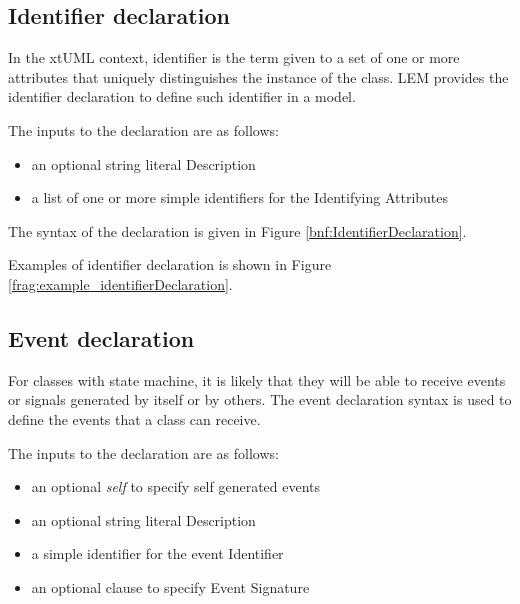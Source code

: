 

\subsection{Identifier declaration}\label{identifierDeclaration}
In the xtUML context, identifier is the term given to a set of one or more attributes that uniquely distinguishes the instance of the class. LEM provides the identifier declaration to define such identifier in a model.

The inputs to the declaration are as follows:
\begin{itemize}
\item an optional string literal Description
\item a list of one or more simple identifiers for  the Identifying Attributes
\end{itemize}

The syntax of the declaration is given in Figure \ref{bnf:IdentifierDeclaration}.


Examples of identifier declaration is shown in Figure \ref{frag:example_identifierDeclaration}.


\subsection{Event declaration}\label{sec:eventDeclaration}
For classes with state machine, it is likely that they will be able to receive events or signals generated by itself or by others. The event declaration syntax is used to define the events that a class can receive. 

The inputs to the declaration are as follows:
\begin{itemize}
\item an optional \textit{self} to specify self generated events
\item an optional string literal Description
\item a simple identifier for the event Identifier
\item an optional clause to specify Event Signature
\end{itemize}

